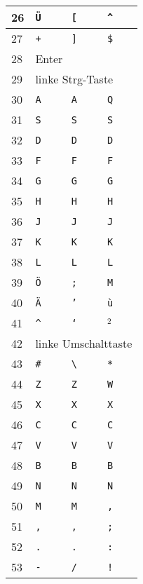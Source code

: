 \begin{longtable}{|l|l|l|l|}
  26 & \texttt{Ü} & \texttt{[} & \texttt{\^} \\ \hline
  27 & \texttt{+} & \texttt{]} & \texttt{\$} \\ \hline
  28 & \multicolumn{3}{|l|}{Enter} \\ \hline
  29 & \multicolumn{3}{|l|}{linke Strg-Taste} \\ \hline
  30 & \texttt{A} & \texttt{A} & \texttt{Q} \\ \hline
  31 & \texttt{S} & \texttt{S} & \texttt{S} \\ \hline
  32 & \texttt{D} & \texttt{D} & \texttt{D} \\ \hline
  33 & \texttt{F} & \texttt{F} & \texttt{F} \\ \hline
  34 & \texttt{G} & \texttt{G} & \texttt{G} \\ \hline
  35 & \texttt{H} & \texttt{H} & \texttt{H} \\ \hline
  36 & \texttt{J} & \texttt{J} & \texttt{J} \\ \hline
  37 & \texttt{K} & \texttt{K} & \texttt{K} \\ \hline
  38 & \texttt{L} & \texttt{L} & \texttt{L} \\ \hline
  39 & \texttt{Ö} & \texttt{;} & \texttt{M} \\ \hline
  40 & \texttt{Ä} & \texttt{'} & \texttt{ù} \\ \hline
  41 & \texttt{\^} & \texttt{`} & $^2$ \\ \hline
  42 & \multicolumn{3}{|l|}{linke Umschalttaste} \\ \hline
  43 & \texttt{\#} & \texttt{\textbackslash} & \texttt{*} \\ \hline
  44 & \texttt{Z} & \texttt{Z} & \texttt{W} \\ \hline
  45 & \texttt{X} & \texttt{X} & \texttt{X} \\ \hline
  46 & \texttt{C} & \texttt{C} & \texttt{C} \\ \hline
  47 & \texttt{V} & \texttt{V} & \texttt{V} \\ \hline
  48 & \texttt{B} & \texttt{B} & \texttt{B} \\ \hline
  49 & \texttt{N} & \texttt{N} & \texttt{N} \\ \hline
  50 & \texttt{M} & \texttt{M} & \texttt{,} \\ \hline
  51 & \texttt{,} & \texttt{,} & \texttt{;} \\ \hline
  52 & \texttt{.} & \texttt{.} & \texttt{:} \\ \hline
  53 & \texttt{-} & \texttt{/} & \texttt{!} \\ \hline

\end{longtable}
